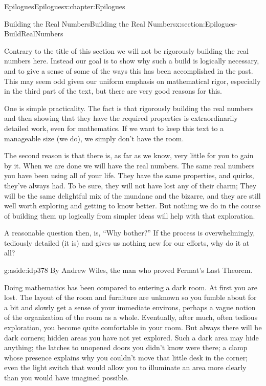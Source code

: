 \begin{chapterptx}{Epilogues}{}{Epilogues}{}{}{x:chapter:Epilogues}
	\begin{sectionptx}{Building the Real Numbers}{}{Building the Real Numbers}{}{}{x:section:Epilogues-BuildRealNumbers}
		\begin{introduction}{}%
			Contrary to the title of this section we will not be rigorously building the real numbers here. Instead our goal is to show why such a build is logically necessary, and to give a sense of some of the ways this has been accomplished in the past. This may seem odd given our uniform emphasis on mathematical rigor, especially in the third part of the text, but there are very good reasons for this.%
			\par
			One is simple practicality. The fact is that rigorously building the real numbers and then showing that they have the required properties is extraordinarily detailed work, even for mathematics. If we want to keep this text to a manageable size (we do), we simply don't have the room.%
			\par
			The second reason is that there is, as far as we know, very little for you to gain by it. When we are done we will have the real numbers. The same real numbers you have been using all of your life. They have the same properties, and quirks, they've always had. To be sure, they will not have lost any of their charm; They will be the same delightful mix of the mundane and the bizarre, and they are still well worth exploring and getting to know better. But nothing we do in the course of building them up logically from simpler ideas will help with that exploration.%
			\par
			A reasonable question then, is, ``Why bother?'' If the process is overwhelmingly, tediously detailed (it is) and gives us nothing new for our efforts, why do it at all?%
			\begin{aside}{}{g:aside:idp378}%
				By Andrew Wiles, the man who proved Fermat's Last Theorem.%
			\end{aside}
			Doing mathematics has been compared to entering a dark room.  At first you are lost.  The layout of the room and furniture are unknown so you fumble about for a bit and slowly get a sense of your immediate environs, perhaps a vague notion of the organization of the room as a whole.  Eventually, after much, often tedious exploration, you become quite comfortable in your room.  But always there will be dark corners; hidden areas you have not yet explored.  Such a dark area may hide anything; the latches to unopened doors you didn't know were there; a clamp whose presence explains why you couldn't move that little desk in the corner; even the light switch that would allow you to illuminate an area more clearly than you would have imagined possible.%

\end{introduction}
\end{sectionptx}
\end{chapterptx}
